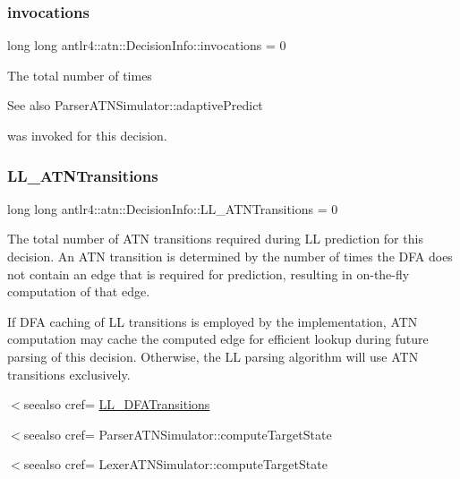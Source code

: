 \subsubsection{\texorpdfstring{invocations}{invocations}}
{\footnotesize\ttfamily long long antlr4\+::atn\+::\+Decision\+Info\+::invocations = 0}



The total number of times \begin{DoxySeeAlso}{See also}
Parser\+A\+T\+N\+Simulator\+::adaptive\+Predict


\end{DoxySeeAlso}
was invoked for this decision. 

\mbox{\label{classantlr4_1_1atn_1_1DecisionInfo_a4e600839653af69293014d3aa7d4e6fd}} 
\subsubsection{\texorpdfstring{L\+L\+\_\+\+A\+T\+N\+Transitions}{LL\_ATNTransitions}}
{\footnotesize\ttfamily long long antlr4\+::atn\+::\+Decision\+Info\+::\+L\+L\+\_\+\+A\+T\+N\+Transitions = 0}



The total number of A\+TN transitions required during LL prediction for this decision. An A\+TN transition is determined by the number of times the D\+FA does not contain an edge that is required for prediction, resulting in on-\/the-\/fly computation of that edge. 

If D\+FA caching of LL transitions is employed by the implementation, A\+TN computation may cache the computed edge for efficient lookup during future parsing of this decision. Otherwise, the LL parsing algorithm will use A\+TN transitions exclusively.

$<$seealso cref= \hyperlink{classantlr4_1_1atn_1_1DecisionInfo_a9d709cc94f1b7886e1c3be5cf46ac2c4}{L\+L\+\_\+\+D\+F\+A\+Transitions} 

$<$seealso cref= Parser\+A\+T\+N\+Simulator\+::compute\+Target\+State 

$<$seealso cref= Lexer\+A\+T\+N\+Simulator\+::compute\+Target\+State \mbox{\label{classantlr4_1_1atn_1_1DecisionInfo_a9d709cc94f1b7886e1c3be5cf46ac2c4}} 
